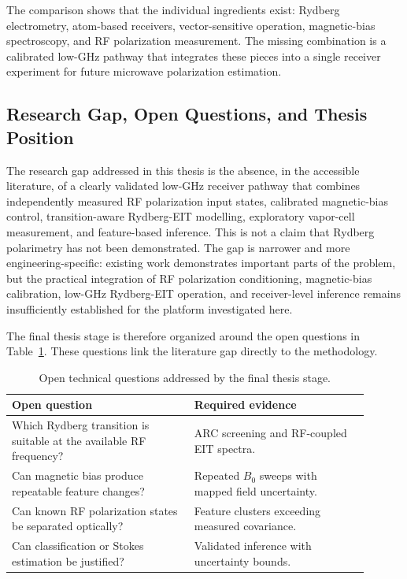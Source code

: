 \documentclass{ieeeaccess}
\begin{document}
The comparison shows that the individual ingredients exist: Rydberg electrometry, atom-based receivers, vector-sensitive operation, magnetic-bias spectroscopy, and RF polarization measurement. The missing combination is a calibrated low-GHz pathway that integrates these pieces into a single receiver experiment for future microwave polarization estimation.

\subsection{Research Gap, Open Questions, and Thesis Position}
\label{subsec:lit_gap}

The research gap addressed in this thesis is the absence, in the accessible literature, of a clearly validated low-GHz receiver pathway that combines independently measured RF polarization input states, calibrated magnetic-bias control, transition-aware Rydberg-EIT modelling, exploratory vapor-cell measurement, and feature-based inference. This is not a claim that Rydberg polarimetry has not been demonstrated. The gap is narrower and more engineering-specific: existing work demonstrates important parts of the problem, but the practical integration of RF polarization conditioning, magnetic-bias calibration, low-GHz Rydberg-EIT operation, and receiver-level inference remains insufficiently established for the platform investigated here.

The final thesis stage is therefore organized around the open questions in Table~\ref{tab:open_questions}. These questions link the literature gap directly to the methodology.

\begin{table}[!t]
\caption{Open technical questions addressed by the final thesis stage.}
\label{tab:open_questions}
\centering
\renewcommand{\arraystretch}{1.10}
\scriptsize
\begin{tabular}{p{0.46\linewidth} p{0.44\linewidth}}
\hline
\textbf{Open question} & \textbf{Required evidence} \\
\hline
Which Rydberg transition is suitable at the available RF frequency? & ARC screening and RF-coupled EIT spectra. \\
Can magnetic bias produce repeatable feature changes? & Repeated \(B_0\) sweeps with mapped field uncertainty. \\
Can known RF polarization states be separated optically? & Feature clusters exceeding measured covariance. \\
Can classification or Stokes estimation be justified? & Validated inference with uncertainty bounds. \\
\hline
\end{tabular}
\end{table}
\end{document}
